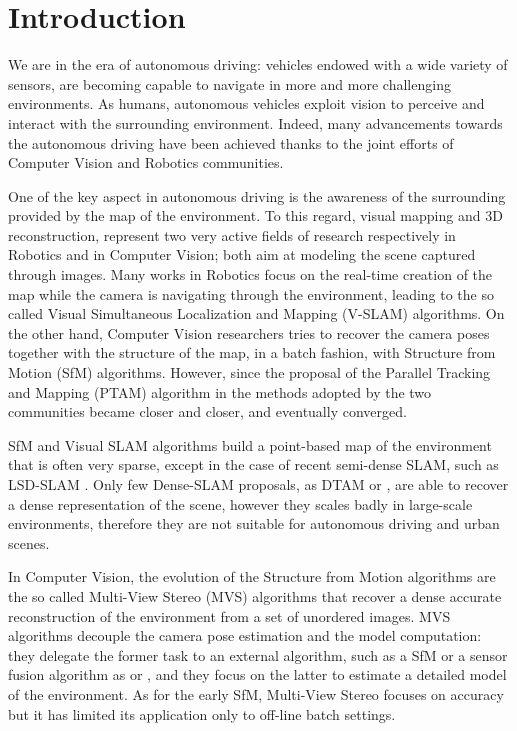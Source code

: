 
\chapter{Introduction}
\label{sec:intro}
We are in the era of autonomous driving: vehicles endowed with a wide variety of sensors, are becoming  capable to navigate in more and more challenging environments.
As humans,  autonomous vehicles exploit vision to perceive and interact with the surrounding environment.
Indeed, many advancements towards the autonomous driving have been achieved thanks to the joint efforts of Computer Vision and Robotics communities.


One of the key aspect in autonomous driving is the awareness of the surrounding provided by the map of the environment. 
To this regard, visual mapping and 3D reconstruction, represent two very active fields of research respectively in Robotics and in Computer Vision; both aim at modeling the scene captured through images.
Many works in Robotics focus on the real-time creation of the map while the camera is navigating through the environment, leading to the so called Visual Simultaneous Localization and Mapping (V-SLAM) algorithms. 
On the other hand, Computer Vision researchers tries to recover the  camera poses together with the structure of the map, in a batch fashion, with Structure from Motion (SfM) algorithms.
However, since the proposal of the Parallel Tracking and Mapping (PTAM) algorithm in \cite{klein_murray07} the methods adopted by the two communities became closer and closer, and eventually converged.

SfM and Visual SLAM algorithms build a point-based map of the environment that is often very sparse, except in the case of recent semi-dense SLAM, such as LSD-SLAM \cite{engel2014lsd}. 
Only few Dense-SLAM proposals, as DTAM \cite{newcombe2011dtam} or \cite{newcombe2010live}, are able to recover a dense representation of the scene, however they scales badly in large-scale environments, therefore they are not suitable for autonomous driving and urban scenes.

In Computer Vision, the evolution of the Structure from Motion algorithms are the  so called Multi-View Stereo (MVS) algorithms that recover a dense accurate reconstruction of the environment from a set of unordered images. 
MVS algorithms decouple the camera pose estimation and the model computation: they delegate the former task to an external algorithm, such as a SfM or a sensor fusion algorithm as \cite{mouragnon_et_al07} or \cite{cucci_matteucci13}, and they focus on the latter to estimate a detailed model of the environment.
As for the early SfM,  Multi-View Stereo focuses on accuracy but it has limited its application only to off-line  batch settings.


